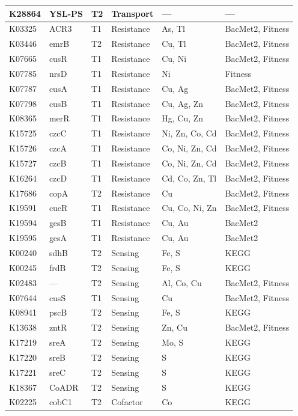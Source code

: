 \documentclass[11pt]{article}
\begin{document}
\begin{longtable}{@{}llllp{3.8cm}l@{}}
K28864 & YSL-PS & T2 & Transport & --- & --- \\
\midrule
K03325 & ACR3 & T1 & Resistance & As, Tl & BacMet2, Fitness \\
K03446 & emrB & T2 & Resistance & Cu, Tl & BacMet2, Fitness \\
K07665 & cusR & T1 & Resistance & Cu, Ni & BacMet2, Fitness \\
K07785 & nrsD & T1 & Resistance & Ni & Fitness \\
K07787 & cusA & T1 & Resistance & Cu, Ag & BacMet2, Fitness \\
K07798 & cusB & T1 & Resistance & Cu, Ag, Zn & BacMet2, Fitness \\
K08365 & merR & T1 & Resistance & Hg, Cu, Zn & BacMet2, Fitness \\
K15725 & czcC & T1 & Resistance & Ni, Zn, Co, Cd & BacMet2, Fitness \\
K15726 & czcA & T1 & Resistance & Co, Ni, Zn, Cd & BacMet2, Fitness \\
K15727 & czcB & T1 & Resistance & Co, Ni, Zn, Cd & BacMet2, Fitness \\
K16264 & czcD & T1 & Resistance & Cd, Co, Zn, Tl & BacMet2, Fitness \\
K17686 & copA & T2 & Resistance & Cu & BacMet2, Fitness \\
K19591 & cueR & T1 & Resistance & Cu, Co, Ni, Zn & BacMet2, Fitness \\
K19594 & gesB & T1 & Resistance & Cu, Au & BacMet2 \\
K19595 & gesA & T1 & Resistance & Cu, Au & BacMet2 \\
\midrule
K00240 & sdhB & T2 & Sensing & Fe, S & KEGG \\
K00245 & frdB & T2 & Sensing & Fe, S & KEGG \\
K02483 & --- & T2 & Sensing & Al, Co, Cu & BacMet2, Fitness \\
K07644 & cusS & T1 & Sensing & Cu & BacMet2, Fitness \\
K08941 & pscB & T2 & Sensing & Fe, S & KEGG \\
K13638 & zntR & T2 & Sensing & Zn, Cu & BacMet2, Fitness \\
K17219 & sreA & T2 & Sensing & Mo, S & KEGG \\
K17220 & sreB & T2 & Sensing & S & KEGG \\
K17221 & sreC & T2 & Sensing & S & KEGG \\
K18367 & CoADR & T2 & Sensing & S & KEGG \\
\midrule
K02225 & cobC1 & T2 & Cofactor & Co & KEGG \\

\end{longtable}
\end{document}
